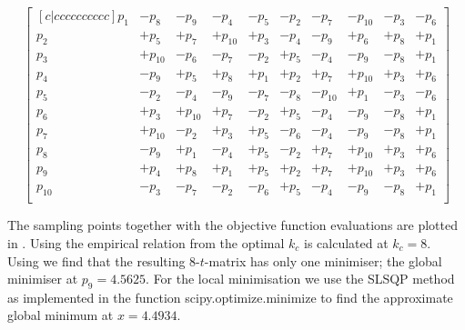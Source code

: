 \begin{equation}
\begin{bmatrix}[c|cccccccccc]
     p_{1}  &  -p_{8}  &  -p_{9}  &  -p_{4}  &  -p_{5}  &  -p_{2}  &  -p_{7}  &  -p_{10}   & -p_{3}  &  -p_{6} \\
     p_{2}  &  +p_{5}  &  +p_{7}  &  +p_{10}  &  +p_{3}  &  -p_{4}  &  -p_{9}  &  +p_{6}   & +p_{8}  &  +p_{1} \\
     p_{3}  &  +p_{10}  &  -p_{6}  &  -p_{7}  &  -p_{2}  &  +p_{5}  &  -p_{4}  &  -p_{9}   & -p_{8}  &  +p_{1} \\
     p_{4}  &  -p_{9}  &  +p_{5}  &  +p_{8}  &  +p_{1}  &  +p_{2}  &  +p_{7}  &  +p_{10}   & +p_{3}  &  +p_{6} \\
     p_{5}  &  -p_{2}  &  -p_{4}  &  -p_{9}  &  -p_{7}  &  -p_{8}  &  -p_{10}  &  +p_{1}   & -p_{3}  &  -p_{6} \\
     p_{6}  &  +p_{3}  &  +p_{10}  &  +p_{7}  &  -p_{2}  &  +p_{5}  &  -p_{4}  &  -p_{9}   & -p_{8}  &  +p_{1} \\
     p_{7}  &  +p_{10}  &  -p_{2}  &  +p_{3}  &  +p_{5}  &  -p_{6}  &  -p_{4}  &  -p_{9}   & -p_{8}  &  +p_{1} \\
     p_{8}  &  -p_{9}  &  +p_{1}  &  -p_{4}  &  +p_{5}  &  -p_{2}  &  +p_{7}  &  +p_{10}   & +p_{3}  &  +p_{6} \\
     p_{9}  &  +p_{4}  &  +p_{8}  &  +p_{1}  &  +p_{5}  &  +p_{2}  &  +p_{7}  &  +p_{10}   & +p_{3}  &  +p_{6} \\
    p_{10}  &  -p_{3}  &  -p_{7}  &  -p_{2}  &  -p_{6}  &  +p_{5}  &  -p_{4}  &  -p_{9}    &-p_{8}  &  +p_{1} \\
\end{bmatrix}
\end{equation}

The sampling points together with the objective function evaluations are plotted in . Using the empirical relation from \citet{Henderson2015} the optimal $k_c$ is calculated at $k_c = 8$. Using  we find that the resulting $8$-$t$-matrix has only one minimiser; the global minimiser at $p_{9} = 4.5625$. For the local minimisation we use the SLSQP method as implemented in the function scipy.optimize.minimize \cite{scipy} to find the approximate global minimum at $x = 4.4934$. 

